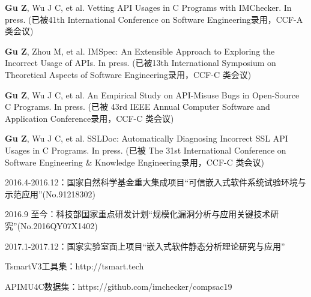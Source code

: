 \begin{resume}
  \begin{publications}[before=\publicationskip,after=\publicationskip]
    \item \textbf{Gu Z}, Wu J C, et al. Vetting API Usages in C Programs with IMChecker. In press. (已被41th International Conference on Software Engineering录用，CCF-A 类会议)
    \item \textbf{Gu Z}, Zhou M, et al. IMSpec: An Extensible Approach to Exploring the Incorrect Usage of APIs. In press. (已被13th International Symposium on Theoretical Aspects of Software Engineering录用，CCF-C 类会议)
    \item \textbf{Gu Z}, Wu J C, et al. An Empirical Study on API-Misuse Bugs in Open-Source C Programs. In press. (已被 43rd IEEE Annual Computer Software and Application Conference录用，CCF-C 类会议)
    \item \textbf{Gu Z}, Wu J C, et al. SSLDoc: Automatically Diagnosing Incorrect SSL API Usages in C Programs. In press. (已被 The 31st International Conference on Software Engineering \& Knowledge Engineering录用，CCF-C 类会议)
  \end{publications}


  \begin{achievements}
  	\item 2016.4-2016.12：国家自然科学基金重大集成项目“可信嵌入式软件系统试验环境与示范应用”(No.91218302)
  	\item 2016.9 至今：科技部国家重点研发计划“规模化漏洞分析与应用关键技术研究”(No.2016QY07X1402)
  	\item 2017.1-2017.12：国家实验室面上项目“嵌入式软件静态分析理论研究与应用”
  	
  \end{achievements}

  \begin{achievements}
    \item TsmartV3工具集：http://tsmart.tech
    \item APIMU4C数据集：https://github.com/imchecker/compsac19
  \end{achievements}

\end{resume}
